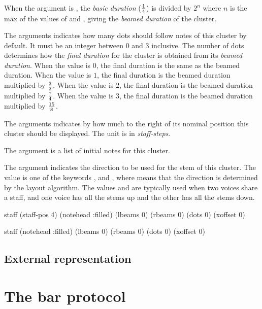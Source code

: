 When the  argument is , the
\emph{basic duration} ($1 \over 4$) is divided by $2^n$ where $n$ is the max
of the values of  and , giving the
\emph{beamed duration} of the cluster. 

The  arguments indicates how many dots should follow
notes of this cluster by default.  It must be an integer between $0$
and $3$ inclusive.  The number of dots determines how the \emph{final
duration} for the cluster is obtained from its \emph{beamed duration}.
When the value is $0$, the final duration is the same as the beamed
duration.  When the value is $1$, the final duration is the beamed
duration multiplied by $3 \over 2$.  When the value is $2$, the final
duration is the beamed duration multiplied by $7 \over 4$.  When the
value is $3$, the final duration is the beamed duration multiplied by
$15 \over 8$.

The  arguments indicates by how much to the right of
its nominal position this cluster should be displayed.  The unit is in
\emph{staff-steps}. 

The  argument is a list of initial notes for this
cluster.

The  argument indicates the direction to be
used for the stem of this cluster.  The value is one of the keywords
,  and , where
 means that the direction is determined by the layout
algorithm.  The values  and  are typically
used when two voices share a staff, and one voice has all the stems up
and the other has all the stems down. 

 {staff \key (staff-pos 4) (notehead :filled) (lbeams 0) (rbeams 0)
		    (dots 0) (xoffset 0)}

 {staff \key (notehead :filled) (lbeams 0) (rbeams 0)
		    (dots 0) (xoffset 0)}

\subsection{External representation}


\section{The bar protocol}

